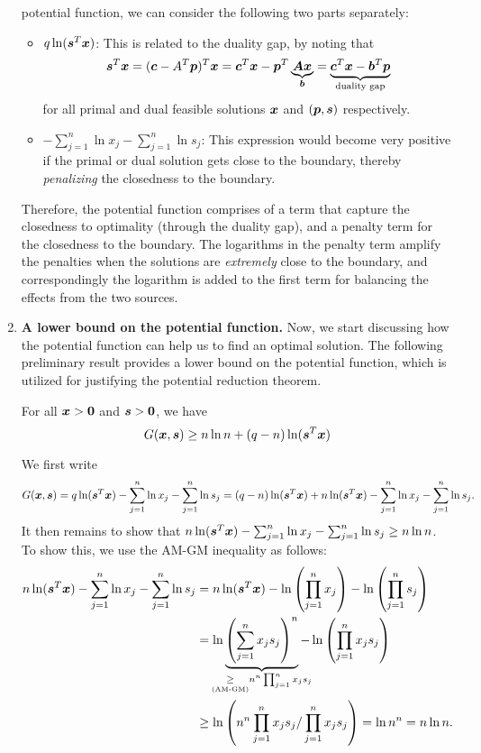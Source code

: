 \begin{enumerate}
potential function, we can consider the following two parts separately:
\begin{itemize}
\item \(q\ln(\bm{s}^{T}\bm{x})\): This is related to the duality gap, by
noting that
\[
\bm{s}^{T}\bm{x}=(\bm{c}-A^{T}\bm{p})^{T}\bm{x}
=\bm{c}^{T}\bm{x}-\bm{p}^{T}\underbrace{\bm{A}\bm{x}}_{\bm{b}}
=\underbrace{\bm{c}^{T}\bm{x}-\bm{b}^{T}\bm{p}}_{\text{duality gap}}
\]
for all primal and dual feasible solutions \(\bm{x}\) and
\((\bm{p},\bm{s})\) respectively.
\item \(-\sum_{j=1}^{n}\ln x_j-\sum_{j=1}^{n}\ln s_j\): This expression would
become very positive if the primal or dual solution gets close to the boundary,
thereby \emph{penalizing} the closedness to the boundary.
\end{itemize}
Therefore, the potential function comprises of a term that capture the
closedness to optimality (through the duality gap), and a penalty term for the
closedness to the boundary. The logarithms in the penalty term amplify
the penalties when the solutions are \emph{extremely} close to the boundary,
and correspondingly the logarithm is added to the first term for
balancing the effects from the two sources.
\item \textbf{A lower bound on the potential function.} Now, we start
discussing how the potential function can help us to find an optimal solution.
The following preliminary result provides a lower bound on the potential
function, which is utilized for justifying the potential reduction theorem.
\begin{lemma}
\label{lma:poten-fn-lb}
For all \(\bm{x}>\bm{0}\) and \(\bm{s}>\bm{0}\), we have
\[
G(\bm{x},\bm{s})\ge n\ln n+(q-n)\ln(\bm{s}^{T}\bm{x})
\]
\end{lemma}
\begin{pf}
We first write
\[
G(\bm{x},\bm{s})=q\ln(\bm{s}^{T}\bm{x})
-\sum_{j=1}^{n}\ln x_j-\sum_{j=1}^{n}\ln s_j
=(q-n)\ln(\bm{s}^{T}\bm{x})
+n\ln(\bm{s}^{T}\bm{x})-\sum_{j=1}^{n}\ln x_j
-\sum_{j=1}^{n}\ln s_j.
\]
It then remains to show that \(n\ln(\bm{s}^{T}\bm{x})-\sum_{j=1}^{n}\ln x_j
-\sum_{j=1}^{n}\ln s_j\ge n\ln n\). To show this, we use the AM-GM inequality
as follows:
\begin{align*}
n\ln(\vect{s}^{T}\vect{x})-\sum_{j=1}^{n}\ln x_j -\sum_{j=1}^{n}\ln s_j
&=n\ln(\vect{s}^{T}\vect{x})-\ln\left(\prod_{j=1}^{n}x_j\right)
-\ln\left(\prod_{j=1}^{n}s_j\right) \\
&=\ln\underbrace{\left(\sum_{j=1}^{n}x_js_j\right)^{n}}
_{\mathclap{\underset{\text{(AM-GM)}}{\ge}n^{n}\prod_{j=1}^{n}x_js_j}}
-\ln\left(\prod_{j=1}^{n}x_js_{j}\right) \\
&\ge \ln\left(n^{n}\prod_{j=1}^{n}x_js_j/\prod_{j=1}^{n}x_js_j\right)
=\ln n^{n}=n\ln n.
\end{align*}
\end{pf}


\end{enumerate}
